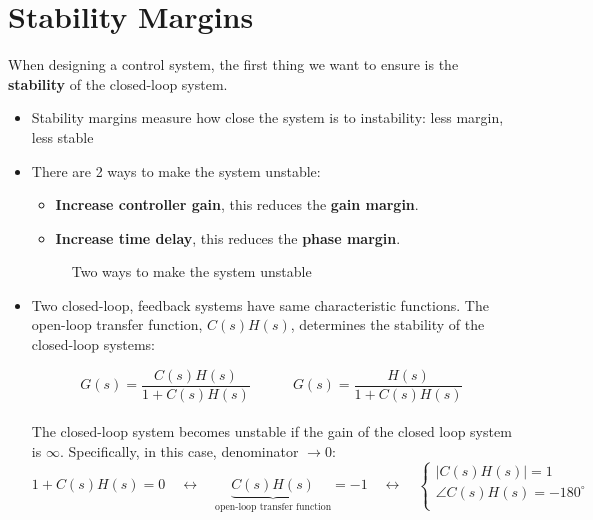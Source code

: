 \newpage
\section{Stability Margins}
When designing a control system,  the first thing we want to ensure is the \textbf{stability} of the closed-loop system.

\begin{itemize}
    \item Stability margins measure how close the system is to instability: less margin, less stable
    
    \item There are 2 ways to make the system unstable:
    \begin{itemize}
        \item \textbf{Increase controller gain}, this reduces the \textbf{gain margin}.
        \item \textbf{Increase time delay}, this reduces the \textbf{phase margin}.
    \end{itemize}
    \begin{figure}[H] 
        \centering
        
        \caption{Two ways to make the system unstable}
    \end{figure}

    \item Two closed-loop, feedback systems have same characteristic functions. The open-loop transfer function, $C(s)H(s)$, determines the stability of the closed-loop systems:
    \begin{figure}[H] 
        \centering
        
    \end{figure} 
    
    \vspace{-1cm}
    \[
    G(s) = \frac{C(s)H(s)}{1+C(s)H(s)} \quad \quad \quad G(s) =\frac{H(s)}{1+C(s)H(s)} 
    \]\\
    The closed-loop system becomes unstable if the gain of the closed loop system is $\infty$. Specifically, in this case, denominator $\to 0$:
    \[
    1+C(s)H(s) =0 \quad \leftrightarrow  \quad \underbrace{C(s)H(s)}_{\text{open-loop transfer function}}=-1 \quad \leftrightarrow \quad \begin{cases}
    \lvert C(s)H(s) \rvert =1 \\
    \angle C(s)H(s) =-180^{\circ}\\
    \end{cases} 
    \]
    

\end{itemize}
